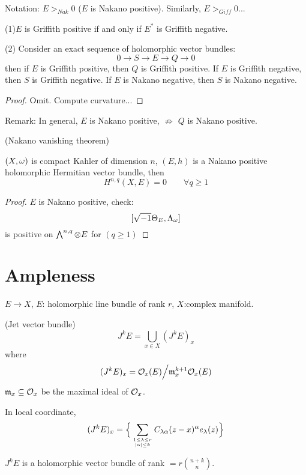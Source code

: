Notation: $E>_{Nak}0$ ($E$ is Nakano positive).
Similarly, $E>_{Giff}0$...

\begin{prop}

(1)$E$ is Griffith positive if and only if $E^*$ is Griffith negative.

(2) Consider an exact sequence of holomorphic vector bundles:
$$0\to S\to E\to Q\to 0$$
then if $E$ is Griffith positive, then $Q$ is Griffith positive.
If $E$ is Griffith negative, then $S$ is Griffith negative.
If $E$ is Nakano negative, then $S$ is Nakano negative.
\end{prop}

\begin{proof}
Omit. Compute curvature...
\end{proof}

Remark: In general, $E$ is Nakano positive, $\not\Rightarrow$
$Q$ is Nakano positive.

\begin{thm}(Nakano vanishing theorem)

$(X,\omega)$ is compact Kahler of dimension $n$,
$(E,h)$ is a Nakano positive holomorphic Hermitian vector bundle, then
$$H^{n,q}(X,E)=0\qquad \forall q\geq 1$$
\end{thm}

\begin{proof}
$E$ is Nakano positive, check:
$$[\sqrt{-1}\Theta_E,\Lambda_\omega]$$
is positive on $\bigwedge\nolimits^{n,q}\otimes E$ for $(q\geq 1)$
\end{proof}

\section{Ampleness}

$E\to X$, $E$: holomorphic line bundle of rank $r$,
$X$:complex manifold.

\begin{definition}(Jet vector bundle)
$$J^kE=\bigcup_{x\in X}(J^kE)_x$$
where
$$(J^kE)_x=\mathcal{O}_x(E)\Big/\mathfrak{m}_x^{k+1}\mathcal{O}_x(E)$$
$\mathfrak{m}_x\subseteq\mathcal{O}_x$ be the maximal ideal of $\mathcal{O}_x$.
\end{definition}

In local coordinate,
$$
  (J^kE)_x
=
  \Big\{
    \sum_{1\leq\lambda\leq r \atop |\alpha|\leq k}
      C_{\lambda\alpha}(z-x)^{\alpha} e_{\lambda}(z)
  \Big\}
$$

\begin{prop}
$J^kE$ is a holomorphic vector bundle of rank $=r{n+k\choose n}$.
\end{prop}

